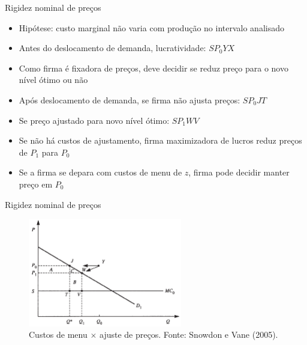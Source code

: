 \documentclass[10pt]{beamer}
\begin{document}
\begin{frame}{Rigidez nominal de preços}
    \begin{itemize}
        \item Hipótese: custo marginal não varia com produção  no intervalo analisado\bigskip
        \item Antes do deslocamento de demanda, lucratividade: $SP_0YX$\bigskip
        \item Como firma é fixadora de preços, deve decidir se reduz preço para o novo nível ótimo ou não\bigskip
        \item Após deslocamento de demanda, se firma não ajusta preços: $SP_0JT$\bigskip
        \item Se preço ajustado para novo nível ótimo: $SP_1WV$\bigskip
        \item Se não há custos de ajustamento, firma maximizadora de lucros reduz preços de $P_1$ para $P_0$\bigskip
        \item Se a firma se depara com custos de menu de $z$, firma pode decidir manter preço em $P_0$
    \end{itemize}
\end{frame}

\begin{frame}{Rigidez nominal de preços}
    \begin{figure}
        \centering
        \includegraphics[width=0.6\textwidth]{./figures/aula15_fig4.PNG}
        \caption{Custos de menu $\times$ ajuste de preços. Fonte: Snowdon e Vane (2005).}
        \label{aula15_fig4}
    \end{figure}
\end{frame}
\end{document}
